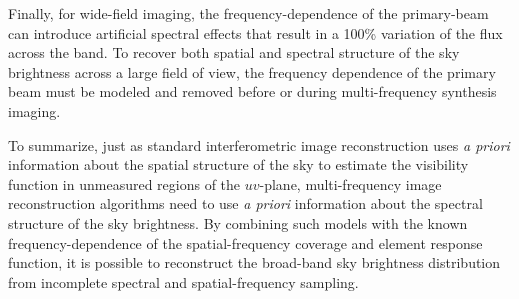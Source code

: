 \documentclass[structabstract]{stylefiles/aa}
\begin{document}
Finally, for wide-field imaging, the frequency-dependence of the primary-beam
can introduce artificial spectral effects that result in a 100\% variation of the
flux across the band. To recover both spatial and spectral structure of
the sky brightness across a large field of view, the frequency dependence of
the primary beam must be modeled and removed before or 
during multi-frequency synthesis imaging.  



To summarize, just as standard interferometric image reconstruction uses 
{\it a priori} information about
the spatial structure of the sky to estimate the
visibility function in unmeasured regions of the $uv$-plane,
multi-frequency image reconstruction
algorithms need to use {\it a priori} information about the spectral
structure of the sky brightness. 
By combining such models 
with the known frequency-dependence of the 
spatial-frequency coverage and element response function, 
it is possible to reconstruct the broad-band sky brightness distribution %
from incomplete spectral and spatial-frequency sampling.

\end{document}
